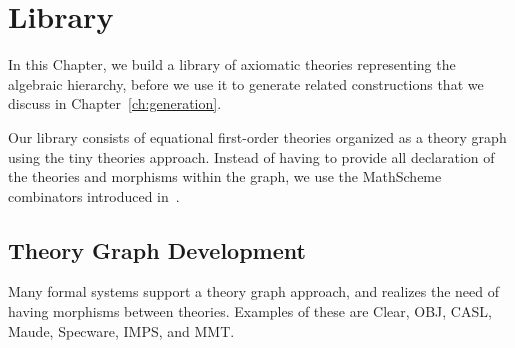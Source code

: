 \chapter{Library}
\label{ch:library}


In this Chapter, we build a library of axiomatic theories representing the algebraic hierarchy, before we use it to generate related constructions that we discuss in Chapter~\ref{ch:generation}. 

Our library consists of equational first-order theories organized as a theory graph using the tiny theories approach. Instead of having to provide all declaration of the theories and morphisms within the graph, we use the MathScheme combinators introduced in~\cite{CaretteOConnorTPC, carette2018building}. 


\begin{comment}
To test our generation algorithms, we needed a large library of equational theories. As we have discussed in Section~\ref{sec:broader_context}, we work in the favor of a library organized as a theory graph, believing that it leverages the structure of mathematical knowledge. Arrows of the graph are the means to relating the different theories. In this section, we present our approach to building a library that emphasizes these connections. 

In Section~\ref{sec:thry_based_libs} we discuss the motivation behind building such a library. In Section~\ref{sec:ms_combinators} we present the combinators used in building it and discuss how they are arrow based. Section~\ref{sec:lib_implementation}, discusses the challenges of the implementation of the combinators to build a theory graph. We finally show some interesting cases of library definitions in Section~\ref{sec:interesting_cases}. 
\end{comment}


\section{Theory Graph Development}
\label{sec:thry_graph_in_action}
Many formal systems support a theory graph approach, and realizes the need of having morphisms between theories. Examples of these are Clear, OBJ, CASL, Maude, Specware, IMPS, and MMT. 

